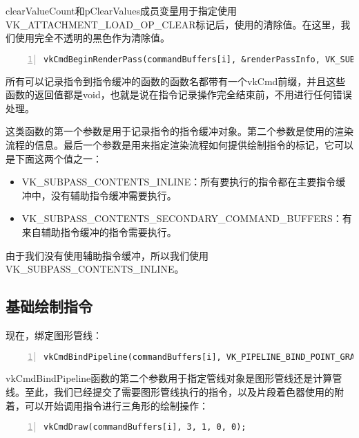 \documentclass{ctexart}
\begin{document}
clearValueCount和pClearValues成员变量用于指定使用VK\_ATTACHMENT\_LOAD\_OP\_CLEAR标记后，使用的清除值。在这里，我们使用完全不透明的黑色作为清除值。

\begin{lstlisting}[language={[ANSI]C},keywordstyle=\color{blue!70},commentstyle=\color{red!50!green!50!blue!50},frame=shadowbox, rulesepcolor=\color{red!20!green!20!blue!20},basicstyle=\small,numbers=left, numberstyle=\tiny,breaklines=true]
vkCmdBeginRenderPass(commandBuffers[i], &renderPassInfo, VK_SUBPASS_CONTENTS_INLINE);
\end{lstlisting}

所有可以记录指令到指令缓冲的函数的函数名都带有一个vkCmd前缀，并且这些函数的返回值都是void，也就是说在指令记录操作完全结束前，不用进行任何错误处理。

这类函数的第一个参数是用于记录指令的指令缓冲对象。第二个参数是使用的渲染流程的信息。最后一个参数是用来指定渲染流程如何提供绘制指令的标记，它可以是下面这两个值之一：

\begin{itemize}
	\item VK\_SUBPASS\_CONTENTS\_INLINE：所有要执行的指令都在主要指令缓冲中，没有辅助指令缓冲需要执行。
	\item VK\_SUBPASS\_CONTENTS\_SECONDARY\_COMMAND\_BUFFERS：有来自辅助指令缓冲的指令需要执行。
\end{itemize}

由于我们没有使用辅助指令缓冲，所以我们使用VK\_SUBPASS\_CONTENTS\_INLINE。

\subsection{基础绘制指令}

现在，绑定图形管线：

\begin{lstlisting}[language={[ANSI]C},keywordstyle=\color{blue!70},commentstyle=\color{red!50!green!50!blue!50},frame=shadowbox, rulesepcolor=\color{red!20!green!20!blue!20},basicstyle=\small,numbers=left, numberstyle=\tiny,breaklines=true]
vkCmdBindPipeline(commandBuffers[i], VK_PIPELINE_BIND_POINT_GRAPHICS, graphicsPipeline);
\end{lstlisting}

vkCmdBindPipeline函数的第二个参数用于指定管线对象是图形管线还是计算管线。至此，我们已经提交了需要图形管线执行的指令，以及片段着色器使用的附着，可以开始调用指令进行三角形的绘制操作：

\begin{lstlisting}[language={[ANSI]C},keywordstyle=\color{blue!70},commentstyle=\color{red!50!green!50!blue!50},frame=shadowbox, rulesepcolor=\color{red!20!green!20!blue!20},basicstyle=\small,numbers=left, numberstyle=\tiny,breaklines=true]
vkCmdDraw(commandBuffers[i], 3, 1, 0, 0);
\end{lstlisting}
\end{document}

